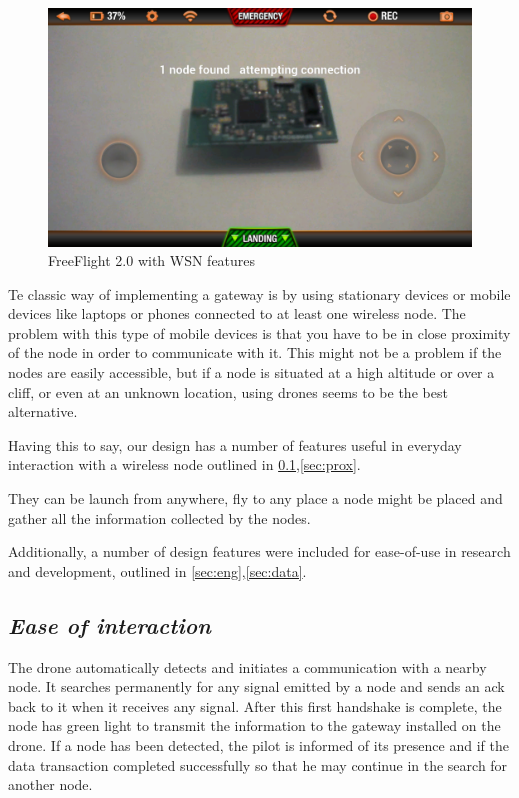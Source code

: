 \label{chap:arch}

\begin{figure}[ht] \centering
\includegraphics[width=1\textwidth]{img/app.png}
\caption{FreeFlight 2.0 with WSN features } \end{figure}

Te classic way of implementing a gateway is by using stationary devices or mobile devices like laptops or phones connected to at least one wireless node. The problem with this type of mobile devices is that you have to be in close proximity of the node in order to communicate with it. This might not be a problem if the nodes are easily accessible, but if a node is situated at a high altitude or over a cliff, or even at an unknown location, using drones seems to be the best alternative.

Having this to say, our design has a number of features useful in everyday interaction with a wireless node outlined in \ref{sec:inter},\ref{sec:prox}. 

They can be launch from anywhere, fly to any place a node might be placed and gather all the information collected by the nodes.

Additionally, a number of design features were included for ease-of-use in
research and development, outlined in \ref{sec:eng},\ref{sec:data}.


\subsection{\textit{Ease of interaction}} 

\label{sec:inter}

The drone automatically detects and initiates a communication with a nearby node. It searches permanently for any signal emitted by a node and sends an ack back to it when it receives any signal. After this first handshake is complete, the node has green light to transmit the information to the gateway installed on the drone. If a node has been detected, the pilot is informed of its presence and if the data transaction completed successfully so that he may continue in the search for another node.

